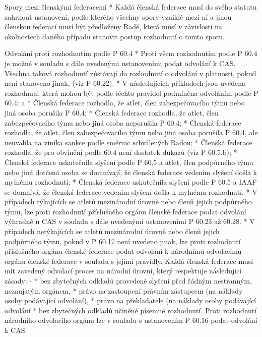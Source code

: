 Spory mezi členskými federacemi
* Každá členská federace musí do svého statutu zahrnout ustanovení, podle kterého všechny spory vzniklé mezi ní a jinou členskou federací musí být předloženy Radě, která musí v závislosti na okolnostech daného případu stanovit postup rozhodnutí o tomto sporu.

Odvolání proti rozhodnutím podle P 60.4
* Proti všem rozhodnutím podle P 60.4  je možné v souladu s dále uvedenými ustanoveními podat odvolání k CAS. Všechna taková rozhodnutí zůstávají do rozhodnutí o odvolání v platnosti, pokud není stanoveno jinak, (viz P 60.22).
* V následujících příkladech jsou uvedena rozhodnutí, která mohou být podle těchto pravidel  podmíněna odvoláním podle P 60.4:
  \begitems \style a
  * Členská federace rozhodla, že atlet, člen zabezpečovacího týmu nebo jiná osoba porušila P 60.4;
  * Členská federace rozhodla, že atlet, člen zabezpečovacího týmu nebo jiná osoba neporušila P 60.4;
  * Členská federace rozhodla, že atlet, člen zabezpečovacího týmu nebo jiná osoba porušila P 60.4, ale neuvalila na viníka sankce podle směrnic schválených Radou;
  * Členská federace rozhodla, že pro obvinění podle 60.4 není dostatek důkazů (viz P 60.5.b);
  * Členská federace uskutečnila slyšení podle P 60.5 a atlet, člen podpůrného týmu nebo jiná dotčená osoba se domnívají, že členská federace vedením slyšení došla k mylnému rozhodnutí;
  * Členská federace uskutečnila slyšení podle P 60.5 a IAAF se domnívá, že členská federace vedením slyšení došla k mylnému rozhodnutí.
  \enditems
* V případech týkajících se atletů mezinárodní úrovně nebo členů jejich podpůrného týmu, lze proti rozhodnutí příslušného orgánu členské federace podat odvolání výhradně u CAS v souladu s dále uvedenými ustanoveními P 60.23 až 60.28.
* V případech netýkajících se atletů mezinárodní úrovně nebo členů jejich podpůrného týmu, pokud  v P 60.17 není uvedeno jinak, lze proti rozhodnutí příslušného orgánu členské federace podat odvolání k národnímu odvolacímu orgánu členské federace v souladu s jejími pravidly. Každá členská federace musí mít zavedený odvolací proces na národní úrovni, který respektuje následující zásady:
  \begitems \style -
  * bez zbytečných odkladů provedené slyšení před řádným nestranným, nezaujatým orgánem,
  * právo na zastoupení právním zástupcem (na náklady osoby podávající odvolání),
  * právo na překladatele (na náklady osoby podávající odvolání
  * bez zbytečných odkladů učiněné písemné rozhodnutí.
  \enditems
Proti rozhodnutí národního odvolacího orgánu lze v souladu s ustanovením P 60.16 podat odvolání k CAS.

